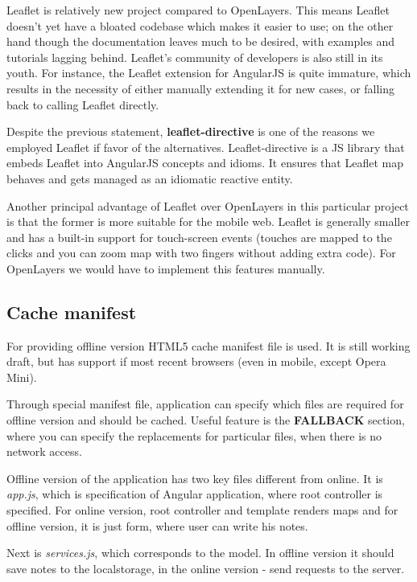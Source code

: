\documentclass[12pt,a4paper]{article}
\begin{document}
Leaflet is relatively new project compared to OpenLayers. This means
Leaflet doesn't yet have a bloated codebase which makes it easier to
use; on the other hand though the documentation leaves much to be
desired, with examples and tutorials lagging behind. Leaflet's
community of developers is also still in its youth. For instance, the
Leaflet extension for AngularJS is quite immature, which results in
the necessity of either manually extending it for new cases, or
falling back to calling Leaflet directly.

Despite the previous statement, \textbf{leaflet-directive} is one of
the reasons we employed Leaflet if favor of the alternatives.
Leaflet-directive is a JS library that embeds Leaflet into AngularJS
concepts and idioms. It ensures that Leaflet map behaves and gets
managed as an idiomatic reactive entity.

Another principal advantage of Leaflet over OpenLayers in this
particular project is that the former is more suitable for the mobile
web. Leaflet is generally smaller and has a built-in support for
touch-screen events (touches are mapped to the clicks and you can zoom
map with two fingers without adding extra code). For OpenLayers we
would have to implement this features manually.

\subsection{Cache manifest}
For providing offline version HTML5 cache manifest file is used. It is still working
draft, but has support if most recent browsers (even in mobile, except Opera Mini).

Through special manifest file, application can specify which files are required for
offline version and should be cached. Useful feature is the \textbf{FALLBACK} section,
where you can specify the replacements for particular files, when there is no network
access.

Offline version of the application has two key files different from online.
It is \textit{app.js}, which is specification of Angular application, where root
controller is specified. For online version, root controller and template renders maps
and for offline version, it is just form, where user can write his notes.

Next is \textit{services.js}, which corresponds to the model. In offline version
it should save notes to the localstorage, in the online version - send requests
to the server.
\end{document}
